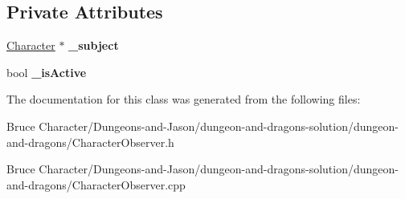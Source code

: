 \subsection*{Private Attributes}
\begin{DoxyCompactItemize}
\item 
\hypertarget{class_character_observer_a74d04923851a23d62959beeaff9e94f5}{}\label{class_character_observer_a74d04923851a23d62959beeaff9e94f5} 
\hyperlink{class_character}{Character} $\ast$ {\bfseries \+\_\+subject}
\item 
\hypertarget{class_character_observer_a3e9f1e51c1d772a8302b376893cd3599}{}\label{class_character_observer_a3e9f1e51c1d772a8302b376893cd3599} 
bool {\bfseries \+\_\+is\+Active}
\end{DoxyCompactItemize}


The documentation for this class was generated from the following files\+:\begin{DoxyCompactItemize}
\item 
Bruce Character/\+Dungeons-\/and-\/\+Jason/dungeon-\/and-\/dragons-\/solution/dungeon-\/and-\/dragons/Character\+Observer.\+h\item 
Bruce Character/\+Dungeons-\/and-\/\+Jason/dungeon-\/and-\/dragons-\/solution/dungeon-\/and-\/dragons/Character\+Observer.\+cpp\end{DoxyCompactItemize}
